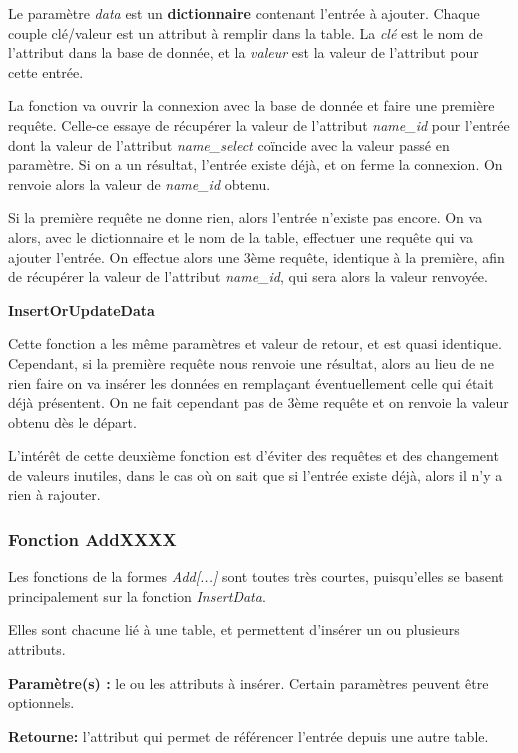 Le paramètre \textit{data} est un \textbf{dictionnaire} contenant l'entrée à ajouter.
Chaque couple clé/valeur est un attribut à remplir dans la table.
La \textit{clé} est le nom de l'attribut dans la base de donnée, et la \textit{valeur} est la valeur de l'attribut pour cette entrée.


La fonction va ouvrir la connexion avec la base de donnée et faire une première requête. Celle-ce essaye de récupérer la valeur de l'attribut \textit{name\_id} pour l'entrée dont la valeur de l'attribut \textit{name\_select} coïncide avec la valeur passé en paramètre.
Si on a un résultat, l'entrée existe déjà, et on ferme la connexion. On renvoie alors la valeur de \textit{name\_id} obtenu.

Si la première requête ne donne rien, alors l'entrée n'existe pas encore. On va alors, avec le dictionnaire et le nom de la table, effectuer une requête qui va ajouter l'entrée.
On effectue alors une 3ème requête, identique à la première, afin de récupérer la valeur de l'attribut \textit{name\_id}, qui sera alors la valeur renvoyée.

\textbf{InsertOrUpdateData}

Cette fonction a les même paramètres et valeur de retour, et est quasi identique. Cependant, si la première requête nous renvoie une résultat, alors au lieu de ne rien faire on va insérer les données en remplaçant éventuellement celle qui était déjà présentent. On ne fait cependant pas de 3ème requête et on renvoie la valeur obtenu dès le départ.


L'intérêt de cette deuxième fonction est d'éviter des requêtes et des changement de valeurs inutiles, dans le cas où on sait que si l'entrée existe déjà, alors il n'y a rien à rajouter.


\subsubsection{Fonction AddXXXX}

Les fonctions de la formes \textit{Add[...]} sont toutes très courtes, puisqu'elles se basent principalement sur la fonction \textit{InsertData}.

Elles sont chacune lié à une table, et permettent d'insérer un ou plusieurs attributs.

\textbf{Paramètre(s) :} le ou les attributs à insérer. Certain paramètres peuvent être optionnels.

\textbf{Retourne: } l'attribut qui permet de référencer l'entrée depuis une autre table.
 
